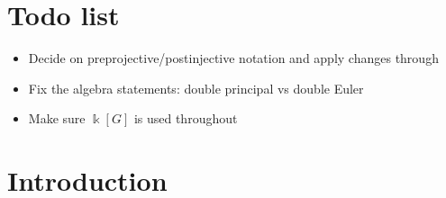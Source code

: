 \documentclass[12pt]{amsart}
\newcommand{\kk}{\Bbbk}%
\theoremstyle{remark}
\numberwithin{equation}{section}
\begin{document}
\begin{abstract}




\end{abstract}

\maketitle

\setcounter{section}{-1}
\section{Todo list}
\begin{itemize}
  \item
    Decide on preprojective/postinjective notation and apply changes through
  \item
    Fix the algebra statements: double principal vs double Euler
  \item
    Make sure $\kk[G]$ is used throughout
\end{itemize}

\section{Introduction}
\end{document}
